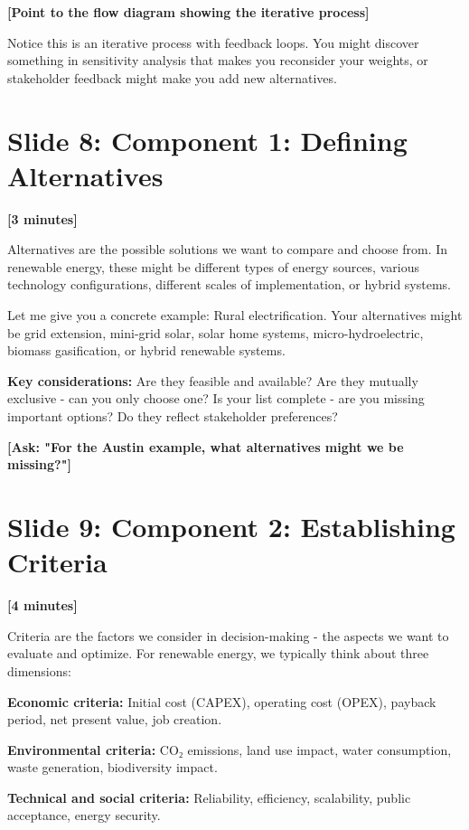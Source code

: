 \documentclass[12pt]{article}
\begin{document}
{{\textcolor{speakernote}{\textbf{[Point to the flow diagram showing the iterative process]}}

Notice this is an iterative process with feedback loops. You might discover something in sensitivity analysis that makes you reconsider your weights, or stakeholder feedback might make you add new alternatives.

\section*{Slide 8: Component 1: Defining Alternatives}
\textcolor{timing}{\textbf{[3 minutes]}}

Alternatives are the possible solutions we want to compare and choose from. In renewable energy, these might be different types of energy sources, various technology configurations, different scales of implementation, or hybrid systems.

Let me give you a concrete example: Rural electrification. Your alternatives might be grid extension, mini-grid solar, solar home systems, micro-hydroelectric, biomass gasification, or hybrid renewable systems.

\textcolor{emphasis}{\textbf{Key considerations:}} Are they feasible and available? Are they mutually exclusive - can you only choose one? Is your list complete - are you missing important options? Do they reflect stakeholder preferences?

\textcolor{speakernote}{\textbf{[Ask: "For the Austin example, what alternatives might we be missing?"]}}

\section*{Slide 9: Component 2: Establishing Criteria}
\textcolor{timing}{\textbf{[4 minutes]}}

Criteria are the factors we consider in decision-making - the aspects we want to evaluate and optimize. For renewable energy, we typically think about three dimensions:

\textcolor{emphasis}{\textbf{Economic criteria:}} Initial cost (CAPEX), operating cost (OPEX), payback period, net present value, job creation.

\textcolor{emphasis}{\textbf{Environmental criteria:}} CO₂ emissions, land use impact, water consumption, waste generation, biodiversity impact.

\textcolor{emphasis}{\textbf{Technical and social criteria:}} Reliability, efficiency, scalability, public acceptance, energy security.

}}
\end{document}
